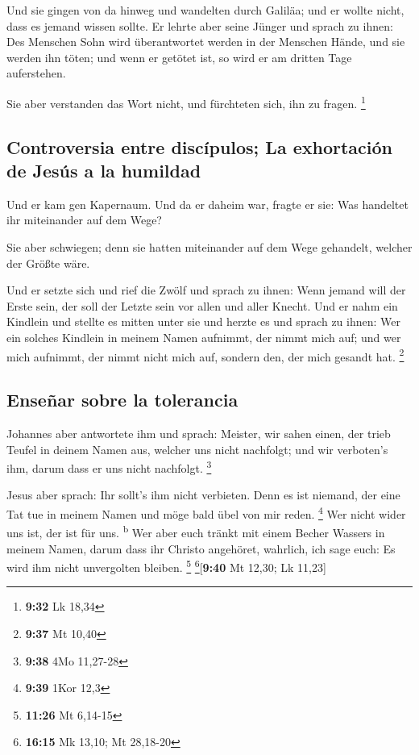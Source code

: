  Und sie gingen von da hinweg und wandelten durch
Galiläa; und er wollte nicht, dass es jemand wissen sollte.
 Er lehrte aber seine Jünger und sprach zu ihnen: Des
Menschen Sohn wird überantwortet werden in der Menschen Hände, und sie
werden ihn töten; und wenn er getötet ist, so wird er am dritten Tage
auferstehen.

 Sie aber verstanden das Wort nicht, und fürchteten sich,
ihn zu fragen. \footnote{\textbf{9:32} Lk 18,34}

\hypertarget{controversia-entre-discuxedpulos-la-exhortaciuxf3n-de-jesuxfas-a-la-humildad}{%
\subsection{Controversia entre discípulos; La exhortación de Jesús a la
humildad}\label{controversia-entre-discuxedpulos-la-exhortaciuxf3n-de-jesuxfas-a-la-humildad}}

 Und er kam gen Kapernaum. Und da er daheim war, fragte
er sie: Was handeltet ihr miteinander auf dem Wege?

 Sie aber schwiegen; denn sie hatten miteinander auf dem
Wege gehandelt, welcher der Größte wäre.

 Und er setzte sich und rief die Zwölf und sprach zu
ihnen: Wenn jemand will der Erste sein, der soll der Letzte sein vor
allen und aller Knecht.  Und er nahm ein Kindlein und
stellte es mitten unter sie und herzte es und sprach zu ihnen:
 Wer ein solches Kindlein in meinem Namen aufnimmt, der
nimmt mich auf; und wer mich aufnimmt, der nimmt nicht mich auf, sondern
den, der mich gesandt hat. \footnote{\textbf{9:37} Mt 10,40}

\hypertarget{enseuxf1ar-sobre-la-tolerancia}{%
\subsection{Enseñar sobre la
tolerancia}\label{enseuxf1ar-sobre-la-tolerancia}}

 Johannes aber antwortete ihm und sprach: Meister, wir
sahen einen, der trieb Teufel in deinem Namen aus, welcher uns nicht
nachfolgt; und wir verboten's ihm, darum dass er uns nicht nachfolgt.
\footnote{\textbf{9:38} 4Mo 11,27-28}

 Jesus aber sprach: Ihr sollt's ihm nicht verbieten. Denn
es ist niemand, der eine Tat tue in meinem Namen und möge bald übel von
mir reden. \footnote{\textbf{9:39} 1Kor 12,3}  Wer nicht
wider uns ist, der ist für uns. \textsuperscript{b}  Wer
aber euch tränkt mit einem Becher Wassers in meinem Namen, darum dass
ihr Christo angehöret, wahrlich, ich sage euch: Es wird ihm nicht
unvergolten bleiben. \footnote{\textbf{11:26} Mt 6,14-15}
\footnote{\textbf{16:15} Mk 13,10; Mt 28,18-20}{[}\textbf{9:40} Mt
12,30; Lk 11,23{]}

